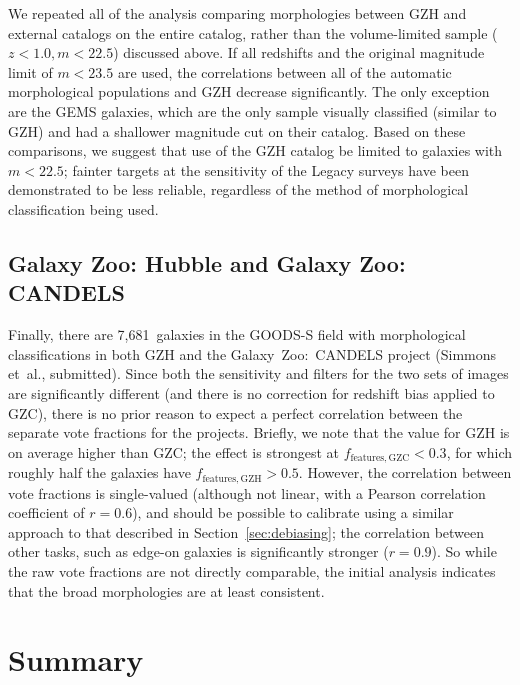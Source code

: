 \documentclass[twocolumn]{aastex6}
\begin{document}
We repeated all of the analysis comparing morphologies between GZH and external
catalogs on the entire catalog, rather than the volume-limited sample
($z<1.0,m<22.5$) discussed above. If all redshifts and the original magnitude
limit of $m<23.5$ are used, the correlations between all of the automatic
morphological populations and GZH decrease significantly.  The only exception
are the GEMS galaxies, which are the only sample visually classified (similar
to GZH) and had a shallower magnitude cut on their catalog. Based on these
comparisons, we suggest that use of the GZH catalog be limited to galaxies with
$m<22.5$; fainter targets at the sensitivity of the \hst{} Legacy surveys have
been demonstrated to be less reliable, regardless of the method of
morphological classification being used.

\subsection{Galaxy Zoo: Hubble and Galaxy Zoo: CANDELS}\label{ssec:gzh_gzc}

Finally, there are 7,681~galaxies in the GOODS-S field with morphological
classifications in both GZH and the Galaxy~Zoo:~CANDELS project (Simmons
et~al., submitted). Since both the sensitivity and filters for the two sets of
images are significantly different (and there is no correction for redshift
bias applied to GZC), there is no prior reason to expect a perfect correlation
between the separate vote fractions for the projects. Briefly, we note that the
\ffeatures{} value for GZH is on average higher than GZC; the effect is
strongest at $f_\mathrm{features,GZC}<0.3$, for which roughly half the galaxies
have $f_\mathrm{features,GZH}>0.5$. However, the correlation between vote
fractions is single-valued (although not linear, with a Pearson correlation
coefficient of $r=0.6$), and should be possible to calibrate using a similar
approach to that described in Section~\ref{sec:debiasing}; the correlation
between other tasks, such as edge-on galaxies is significantly stronger
($r=0.9$). So while the raw vote fractions are not directly comparable, the
initial analysis indicates that the broad morphologies are at least consistent.

\section{Summary}\label{sec:summary}

\end{document}
